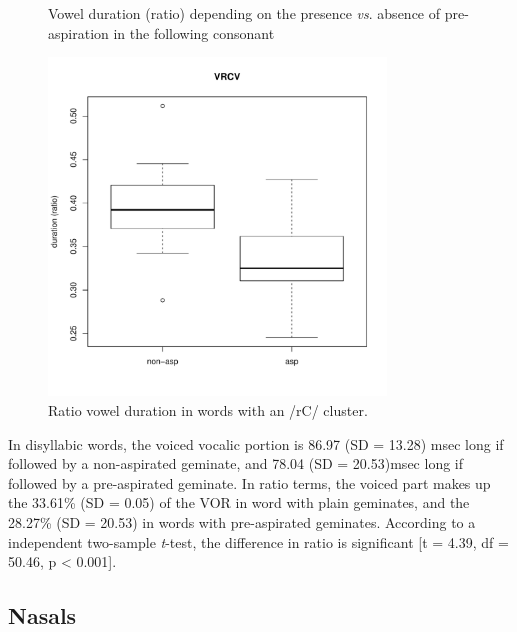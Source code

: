 \documentclass[11pt,a4paper,openany]{memoir}\usepackage[]{graphicx}\usepackage[]{color}
\newenvironment{knitrout}{}{} %
\begin{document}
\begin{figure}
\begin{subfigure}{.5\textwidth}
\begin{knitrout}
\end{knitrout}
\end{subfigure}
\caption{Vowel duration (ratio) depending on the presence \textit{vs}. absence of pre-aspiration in the following consonant}
\label{f:vowelduration}
\end{figure}

\begin{figure}
\centering
\begin{knitrout}
\color{fgcolor}
\includegraphics[width=0.8\textwidth]{img/di-rho-box-1} 

\end{knitrout}
\caption{Ratio vowel duration in words with an /rC/ cluster.}
\label{f:voweldurrho}
\end{figure}



In disyllabic words, the voiced vocalic portion is 86.97 (SD = 13.28) msec long if followed by a non-aspirated geminate, and 78.04 (SD = 20.53)msec long if followed by a pre-aspirated geminate.
In ratio terms, the voiced part makes up the 33.61\% (SD = 0.05) of the VOR in word with plain geminates, and the 28.27\% (SD = 20.53) in words with pre-aspirated geminates.
According to a independent two-sample \textit{t}-test, the difference in ratio is significant [t = 4.39, df = 50.46, p < 0.001].

\subsection{Nasals}
\end{document}
